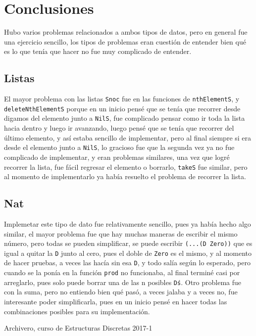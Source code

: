 \documentclass[spanish,12pt,letterpaper]{article}
\begin{document}
\section{Conclusiones}

Hubo varios problemas relacionados a ambos tipos de datos, pero en general fue
una ejercicio sencillo, los tipos de problemas eran cuestión de entender bien
qué es lo que tenía que hacer no fue muy complicado de entender.

\subsection{Listas}

El mayor problema con las listas \texttt{Snoc} fue en las funciones de
\texttt{nthElementS}, y \texttt{deleteNthElementS} porque en un inicio pensé que
se tenía que recorrer desde digamos del elemento junto a \texttt{NilS}, fue
complicado pensar como ir toda la lista hacia dentro y luego ir avanzando, luego
pensé que se tenía que recorrer del último elemento, y así estaba sencillo de
implementar, pero al final siempre si era desde el elemento junto a
\texttt{NilS}, lo gracioso fue que la segunda vez ya no fue complicado de
implementar, y eran problemas similares, una vez que logré recorrer la lista,
fue fácil regresar el elemento o borrarlo, \texttt{takeS} fue similar, pero al
momento de implementarlo ya había resuelto el problema de recorrer la lista.

\subsection{Nat}

Implemetar este tipo de dato fue relativamente sencillo, pues ya había hecho
algo similar, el mayor problema fue que hay muchas maneras de escribir el mismo
número, pero todas se pueden simplificar, se puede escribir \texttt{(...(D
  Zero))} que es igual a quitar la \texttt{D} junto al cero, pues el doble de
\texttt{Zero} es el mismo, y al momento de hacer pruebas, a veces las hacía sin
esa \texttt{D}, y todo salía según lo esperado, pero cuando se la ponía en la
función \texttt{prod} no funcionaba, al final terminé casi por arreglarlo,
pues solo puede borrar una de las n posibles \texttt{D\'s}. Otro problema fue
con la suma, pero no entiendo bien qué pasó, a veces jalaba y a veces no, fue
interesante poder simplificarla, pues en un inicio pensé en hacer todas las
combinaciones posibles para su implementación.


\begin{thebibliography}{9}

  Archivero, curso de Estructuras Discretas 2017-1
\end{thebibliography}
\end{document}
